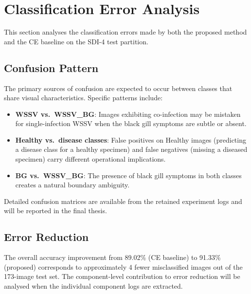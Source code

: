 
\section{Classification Error Analysis}
\label{sec:classification-errors}

This section analyses the classification errors made by both the proposed method and the CE baseline on the SDI-4 test partition.

\subsection{Confusion Pattern}
\label{sec:confusion-pattern}

The primary sources of confusion are expected to occur between classes that share visual characteristics. Specific patterns include:

\begin{itemize}
    \item \textbf{WSSV vs.~WSSV\_BG}: Images exhibiting co-infection may be mistaken for single-infection WSSV when the black gill symptoms are subtle or absent.
    \item \textbf{Healthy vs.~disease classes}: False positives on Healthy images (predicting a disease class for a healthy specimen) and false negatives (missing a diseased specimen) carry different operational implications.
    \item \textbf{BG vs.~WSSV\_BG}: The presence of black gill symptoms in both classes creates a natural boundary ambiguity.
\end{itemize}

Detailed confusion matrices are available from the retained experiment logs and will be reported in the final thesis.

\subsection{Error Reduction}
\label{sec:error-reduction}

The overall accuracy improvement from 89.02\% (CE baseline) to 91.33\% (proposed) corresponds to approximately 4 fewer misclassified images out of the 173-image test set. The component-level contribution to error reduction will be analysed when the individual component logs are extracted.